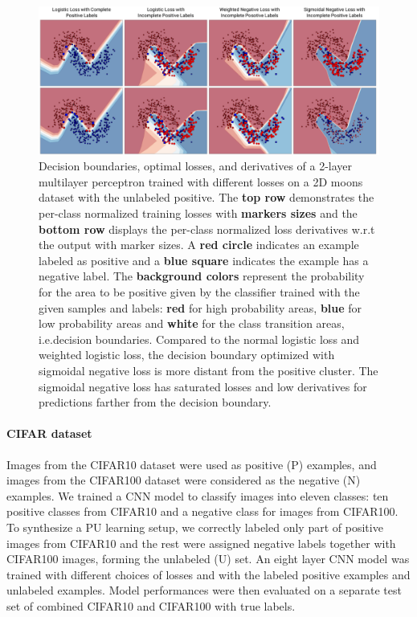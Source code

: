 \begin{figure}
\begin{center}
   \includegraphics[width=0.95\linewidth]{img/moons}
\end{center}
   \caption{
   Decision boundaries, optimal losses, and derivatives of a 2-layer multilayer perceptron trained with different losses on a 2D moons dataset with the unlabeled positive.
   The \textbf{top row} demonstrates the per-class normalized training losses with \textbf{markers sizes} and the \textbf{bottom row} displays the per-class normalized loss derivatives w.r.t the output with marker sizes.
   A \textbf{red circle} indicates an example labeled as positive and a \textbf{blue square} indicates the example has a negative label.
   The \textbf{background colors} represent the probability for the area to be positive given by the classifier trained with the given samples and labels: \textbf{red} for high probability areas, \textbf{blue} for low probability areas and \textbf{white} for the class transition areas, i.e.decision boundaries.
   Compared to the normal logistic loss and weighted logistic loss, the decision boundary optimized with sigmoidal negative loss is more distant from the positive cluster.
   The sigmoidal negative loss has saturated losses and low derivatives for predictions farther from the decision boundary.
   }
\label{fig:moons}
\end{figure}

\paragraph{CIFAR dataset}

Images from the CIFAR10 dataset were used as positive (P) examples, and images from the CIFAR100 dataset were considered as the negative (N) examples.
We trained a CNN model to classify images into eleven classes: ten positive classes from CIFAR10 and a negative class for images from CIFAR100.
To synthesize a PU learning setup, we correctly labeled only part of positive images from CIFAR10 and the rest were assigned negative labels together with CIFAR100 images, forming the unlabeled (U) set.
An eight layer CNN model was trained with different choices of losses and with the labeled positive examples and unlabeled examples.
Model performances were then evaluated on a separate test set of combined CIFAR10 and CIFAR100 with true labels.

